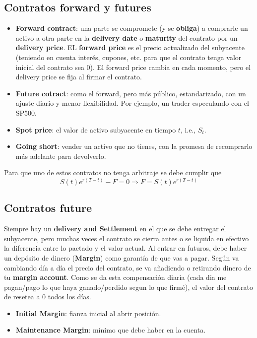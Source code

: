 \subsection{Contratos forward y futures}
\begin{itemize}
    \item \textbf{Forward contract}: una parte se compromete (y se \textbf{obliga}) a comprarle un activo a otra parte en la \textbf{delivery date} o \textbf{maturity} del contrato por un \textbf{delivery price}. EL \textbf{forward price} es el precio actualizado del subyacente (teniendo en cuenta interés, cupones, etc. para que el contrato tenga valor inicial del contrato sea 0). El forward price cambia en cada momento, pero el delivery price se fija al firmar el contrato.
    \item \textbf{Future cotract}: como el forward, pero más público, estandarizado, con un ajuste diario y menor flexibilidad. Por ejemplo, un trader especulando con el SP500.
    \item \textbf{Spot price}: el valor de activo subyacente en tiempo $t$, i.e., $S_t$.
    \item \textbf{Going short}: vender un activo que no tienes, con la promesa de recomprarlo más adelante para devolverlo.
\end{itemize}
Para que uno de estos contratos no tenga arbitraje se debe cumplir que
$$S(t)e^{r(T-t)}-F=0 \Rightarrow F=S(t)e^{r(T-t)}$$



\subsection{Contratos future}
Siempre hay un \textbf{delivery and Settlement} en el que se debe entregar el subyacente, pero muchas veces el contrato se cierra antes o se liquida en efectivo la diferencia entre lo pactado y el valor actual.
Al entrar en futuros, debe haber un depósito de dinero (\textbf{Margin}) como garantía de que vas a pagar. Según va cambiando día a día el precio del contrato, se va añadiendo o retirando dinero de tu \textbf{margin account}. Como se da esta compensación diaria (cada dia me pagan/pago lo que haya ganado/perdido segun lo que firmé), el valor del contrato de resetea a 0 todos los días.
\begin{itemize}
    \item \textbf{Initial Margin}: fianza inicial al abrir posición.
    \item \textbf{Maintenance Margin}: mínimo que debe haber en la cuenta.
\end{itemize}

